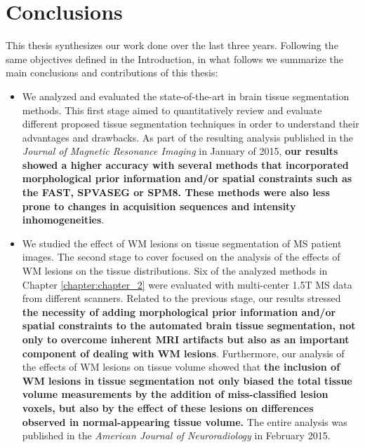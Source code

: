 \chapter{Conclusions}

This thesis synthesizes our work done over the last three years. Following the same objectives defined in the Introduction, in what follows  we summarize the main conclusions and contributions of this thesis: 

\begin{itemize}

\item We analyzed and evaluated the state-of-the-art in brain tissue segmentation methods. This first stage aimed to quantitatively review and evaluate different proposed tissue segmentation techniques in order to understand their advantages and drawbacks. As part of the resulting analysis published in the\textit{ Journal of Magnetic Resonance Imaging} in January of 2015,   \textbf{our results showed a higher accuracy with several methods that incorporated morphological prior information and/or spatial constraints such as the FAST, SPVASEG or SPM8. These methods were also less prone to changes in acquisition sequences and intensity inhomogeneities}.

\item We studied the effect of WM lesions on tissue segmentation of MS patient images. The second stage to cover focused on the analysis of the effects of WM lesions on the tissue distributions. Six of the analyzed methods in Chapter \ref{chapter:chapter_2} were evaluated with multi-center 1.5T MS data from different scanners. Related to the previous stage, our results stressed \textbf{the necessity of adding morphological prior information and/or spatial constraints to the automated brain tissue segmentation, not only to overcome inherent MRI artifacts but also as an important component of dealing with WM lesions}. Furthermore, our analysis of the effects of WM lesions on tissue volume showed that \textbf{the inclusion of WM lesions in tissue segmentation not only biased the total tissue volume measurements by the addition of miss-classified lesion voxels, but also by the effect of these lesions on differences observed in normal-appearing tissue volume.} The entire analysis was published in the \textit{American Journal of Neuroradiology} in February 2015.


\end{itemize}

